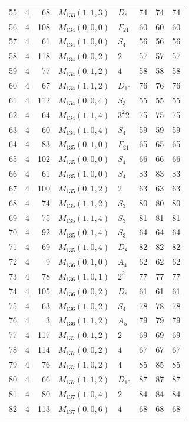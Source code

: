 \documentclass[11pt,a4paper]{article}
\begin{document}
\begin{longtable}{rrr|l|l|rrr}
55 & 4 & 68 & $M_{133}(1,1,3)$ & $D_8$ & 74 & 74 & 74\\
56 & 4 & 108 & $M_{134}(0,0,0)$ & $F_{21}$ & 60 & 60 & 60\\
57 & 4 & 61 & $M_{134}(1,0,0)$ & $S_4$ & 56 & 56 & 56\\
58 & 4 & 118 & $M_{134}(0,0,2)$ & $2$ & 57 & 57 & 57\\
59 & 4 & 77 & $M_{134}(0,1,2)$ & $4$ & 58 & 58 & 58\\
60 & 4 & 67 & $M_{134}(1,1,2)$ & $D_{10}$ & 76 & 76 & 76\\
61 & 4 & 112 & $M_{134}(0,0,4)$ & $S_3$ & 55 & 55 & 55\\
62 & 4 & 64 & $M_{134}(1,1,4)$ & $3^2 2$ & 75 & 75 & 75\\
63 & 4 & 60 & $M_{134}(1,0,4)$ & $S_4$ & 59 & 59 & 59\\
64 & 4 & 83 & $M_{135}(0,1,0)$ & $F_{21}$ & 65 & 65 & 65\\
65 & 4 & 102 & $M_{135}(0,0,0)$ & $S_4$ & 66 & 66 & 66\\
66 & 4 & 61 & $M_{135}(1,0,0)$ & $S_4$ & 83 & 83 & 83\\
67 & 4 & 100 & $M_{135}(0,1,2)$ & $2$ & 63 & 63 & 63\\
68 & 4 & 74 & $M_{135}(1,1,2)$ & $S_3$ & 80 & 80 & 80\\
69 & 4 & 75 & $M_{135}(1,1,4)$ & $S_3$ & 81 & 81 & 81\\
70 & 4 & 92 & $M_{135}(0,1,4)$ & $S_3$ & 64 & 64 & 64\\
71 & 4 & 69 & $M_{135}(1,0,4)$ & $D_8$ & 82 & 82 & 82\\
72 & 4 & 9 & $M_{136}(0,1,0)$ & $A_4$ & 62 & 62 & 62\\
73 & 4 & 78 & $M_{136}(1,0,1)$ & $2^2$ & 77 & 77 & 77\\
74 & 4 & 105 & $M_{136}(0,0,2)$ & $D_8$ & 61 & 61 & 61\\
75 & 4 & 63 & $M_{136}(1,0,2)$ & $S_4$ & 78 & 78 & 78\\
76 & 4 & 3 & $M_{136}(1,1,2)$ & $A_5$ & 79 & 79 & 79\\
77 & 4 & 117 & $M_{137}(0,1,2)$ & $2$ & 69 & 69 & 69\\
78 & 4 & 114 & $M_{137}(0,0,2)$ & $4$ & 67 & 67 & 67\\
79 & 4 & 76 & $M_{137}(1,0,2)$ & $4$ & 85 & 85 & 85\\
80 & 4 & 66 & $M_{137}(1,1,2)$ & $D_{10}$ & 87 & 87 & 87\\
81 & 4 & 80 & $M_{137}(1,0,4)$ & $2$ & 84 & 84 & 84\\
82 & 4 & 113 & $M_{137}(0,0,6)$ & $4$ & 68 & 68 & 68\\

\end{longtable}
\end{document}
